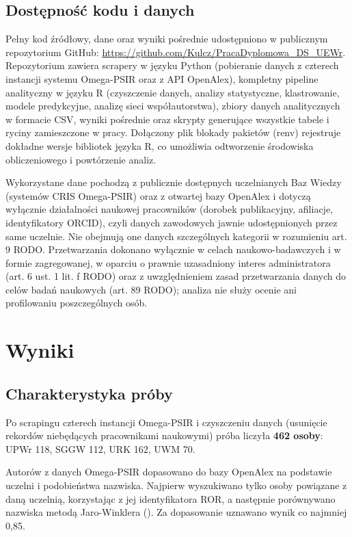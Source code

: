 \documentclass[
  polish,
  12pt,
  a4paper,
]{article}
\begin{document}
\subsection{Dostępność kodu i
danych}\label{dostux119pnoux15bux107-kodu-i-danych}

Pełny kod źródłowy, dane oraz wyniki pośrednie udostępniono w publicznym
repozytorium GitHub:
\url{https://github.com/Kulcz/PracaDyplomowa_DS_UEWr}. Repozytorium
zawiera scrapery w języku Python (pobieranie danych z czterech instancji
systemu Omega-PSIR oraz z API OpenAlex), kompletny pipeline analityczny
w języku R (czyszczenie danych, analizy statystyczne, klastrowanie,
modele predykcyjne, analizę sieci współautorstwa), zbiory danych
analitycznych w formacie CSV, wyniki pośrednie oraz skrypty generujące
wszystkie tabele i ryciny zamieszczone w pracy. Dołączony plik blokady
pakietów (renv) rejestruje dokładne wersje bibliotek języka R, co
umożliwia odtworzenie środowiska obliczeniowego i powtórzenie analiz.

Wykorzystane dane pochodzą z publicznie dostępnych uczelnianych Baz
Wiedzy (systemów CRIS Omega-PSIR) oraz z otwartej bazy OpenAlex i
dotyczą wyłącznie działalności naukowej pracowników (dorobek
publikacyjny, afiliacje, identyfikatory ORCID), czyli danych zawodowych
jawnie udostępnionych przez same uczelnie. Nie obejmują one danych
szczególnych kategorii w rozumieniu art. 9 RODO. Przetwarzania dokonano
wyłącznie w celach naukowo-badawczych i w formie zagregowanej, w oparciu
o prawnie uzasadniony interes administratora (art. 6 ust. 1 lit. f RODO)
oraz z uwzględnieniem zasad przetwarzania danych do celów badań
naukowych (art. 89 RODO); analiza nie służy ocenie ani profilowaniu
poszczególnych osób.

\section{Wyniki}\label{wyniki}

\subsection{Charakterystyka próby}\label{charakterystyka-pruxf3by}

Po scrapingu czterech instancji Omega-PSIR i czyszczeniu danych
(usunięcie rekordów niebędących pracownikami naukowymi) próba liczyła
\textbf{462 osoby}: UPWr 118, SGGW 112, URK 162, UWM 70.

Autorów z danych Omega-PSIR dopasowano do bazy OpenAlex na podstawie
uczelni i podobieństwa nazwiska. Najpierw wyszukiwano tylko osoby
powiązane z daną uczelnią, korzystając z jej identyfikatora ROR, a
następnie porównywano nazwiska metodą Jaro-Winklera
(). Za dopasowanie uznawano
wynik co najmniej 0,85.
\end{document}
